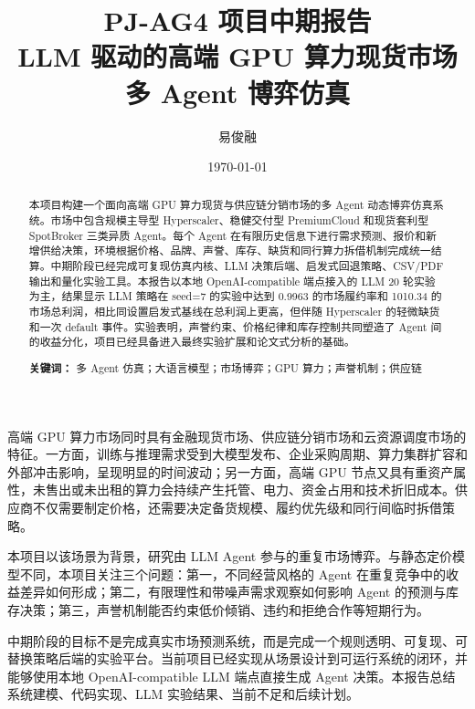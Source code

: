 \documentclass[11pt, a4paper]{article}
\title{\textbf{PJ-AG4 项目中期报告}\\[0.35em]
{\large LLM 驱动的高端 GPU 算力现货市场多 Agent 博弈仿真}}
\author{易俊融}
\date{\today}
\makeatletter
\renewcommand\section{\@startsection{section}{1}{\z@}{-1.2em \@plus -0.3em}{0.5em}{\normalfont\Large\bfseries}}
\makeatother
\begin{document}
\maketitle
\vspace{-1em}

\begin{abstract}
\noindent
本项目构建一个面向高端 GPU 算力现货与供应链分销市场的多 Agent 动态博弈仿真系统。市场中包含规模主导型 Hyperscaler、稳健交付型 PremiumCloud 和现货套利型 SpotBroker 三类异质 Agent。每个 Agent 在有限历史信息下进行需求预测、报价和新增供给决策，环境根据价格、品牌、声誉、库存、缺货和同行算力拆借机制完成统一结算。中期阶段已经完成可复现仿真内核、LLM 决策后端、启发式回退策略、CSV/PDF 输出和量化实验工具。本报告以本地 OpenAI-compatible 端点接入的 LLM 20 轮实验为主，结果显示 LLM 策略在 seed=7 的实验中达到 0.9963 的市场履约率和 1010.34 的市场总利润，相比同设置启发式基线在总利润上更高，但伴随 Hyperscaler 的轻微缺货和一次 default 事件。实验表明，声誉约束、价格纪律和库存控制共同塑造了 Agent 间的收益分化，项目已经具备进入最终实验扩展和论文式分析的基础。

\vspace{0.4em}
\noindent\textbf{关键词：} 多 Agent 仿真；大语言模型；市场博弈；GPU 算力；声誉机制；供应链
\end{abstract}

\section{引言}

高端 GPU 算力市场同时具有金融现货市场、供应链分销市场和云资源调度市场的特征。一方面，训练与推理需求受到大模型发布、企业采购周期、算力集群扩容和外部冲击影响，呈现明显的时间波动；另一方面，高端 GPU 节点又具有重资产属性，未售出或未出租的算力会持续产生托管、电力、资金占用和技术折旧成本。供应商不仅需要制定价格，还需要决定备货规模、履约优先级和同行间临时拆借策略。

本项目以该场景为背景，研究由 LLM Agent 参与的重复市场博弈。与静态定价模型不同，本项目关注三个问题：第一，不同经营风格的 Agent 在重复竞争中的收益差异如何形成；第二，有限理性和带噪声需求观察如何影响 Agent 的预测与库存决策；第三，声誉机制能否约束低价倾销、违约和拒绝合作等短期行为。

中期阶段的目标不是完成真实市场预测系统，而是完成一个规则透明、可复现、可替换策略后端的实验平台。当前项目已经实现从场景设计到可运行系统的闭环，并能够使用本地 OpenAI-compatible LLM 端点直接生成 Agent 决策。本报告总结系统建模、代码实现、LLM 实验结果、当前不足和后续计划。
\end{document}
